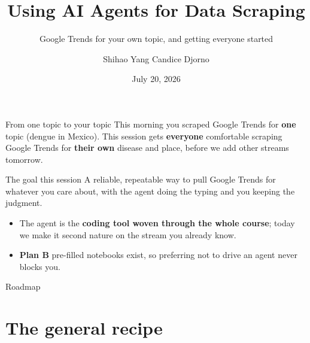 \documentclass[aspectratio=169,11pt]{beamer}
\title{Using AI Agents for Data Scraping}
\subtitle{Google Trends for your own topic, and getting everyone started}
\author{Shihao Yang \quad\textbullet\quad Candice Djorno}
\institute{SISMID 2026 \textbullet\ Day 1, 3:30}
\date{July 20, 2026}
\begin{document}
\begin{frame}
  \titlepage
\end{frame}

\begin{frame}{From one topic to your topic}
  This morning you scraped Google Trends for \textbf{one} topic (dengue in Mexico). This
  session gets \textbf{everyone} comfortable scraping Google Trends for \textbf{their own}
  disease and place, before we add other streams tomorrow.
  \begin{block}{The goal this session}
    A reliable, repeatable way to pull Google Trends for whatever you care about, with the
    agent doing the typing and you keeping the judgment.
  \end{block}
  \vspace{0.3em}
  \begin{itemize}
    \item The agent is the \textbf{coding tool woven through the whole course}; today we make
          it second nature on the stream you already know.
    \item \textbf{Plan B} pre-filled notebooks exist, so preferring not to drive an agent
          never blocks you.
  \end{itemize}
\end{frame}

\begin{frame}{Roadmap}
  \tableofcontents
\end{frame}

\section{The general recipe}
\end{document}
